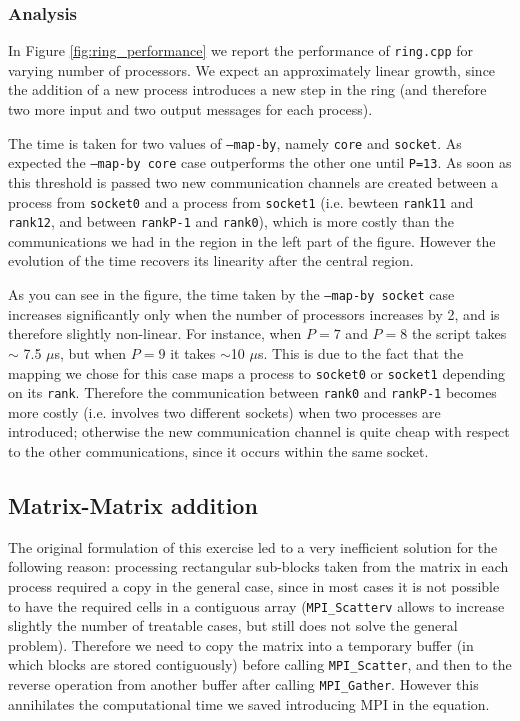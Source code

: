 \documentclass{article}
\begin{document}
\subsubsection{Analysis}
In Figure \ref{fig:ring_performance} we report the performance of \texttt{ring.cpp} for varying number of processors. We expect an approximately linear growth, since the addition of a new process introduces a new step in the ring (and therefore two more input and two output messages for each process).

The time is taken for two values of \texttt{--map-by}, namely \texttt{core} and \texttt{socket}. As expected the \texttt{--map-by core} case outperforms the other one until \texttt{P=13}. As soon as this threshold is passed two new communication channels are created between a process from \texttt{socket0} and a process from \texttt{socket1} (i.e. bewteen \texttt{rank11} and \texttt{rank12}, and between \texttt{rankP-1} and \texttt{rank0}), which is more costly than the communications we had in the region in the left part of the figure. However the evolution of the time recovers its linearity after the central region.

As you can see in the figure, the time taken by the \texttt{--map-by socket} case increases significantly only when the number of processors increases by 2, and is therefore slightly non-linear. For instance, when $P=7$ and $P=8$ the script takes $\sim$ 7.5 $\mu$s, but when $P=9$ it takes $\sim$10 $\mu$s. This is due to the fact that the mapping we chose for this case maps a process to \texttt{socket0} or \texttt{socket1} depending on its \texttt{rank}. Therefore the communication between \texttt{rank0} and \texttt{rankP-1} becomes more costly (i.e. involves two different sockets) when two processes are introduced; otherwise the new communication channel is quite cheap with respect to the other communications, since it occurs within the same socket.

\subsection{Matrix-Matrix addition}
The original formulation of this exercise led to a very inefficient solution for the following reason: processing rectangular sub-blocks taken from the matrix in each process required a copy in the general case, since in most cases it is not possible to have the required cells in a contiguous array (\texttt{MPI\_Scatterv} allows to increase slightly the number of treatable cases, but still does not solve the general problem). Therefore we need to copy the matrix into a temporary buffer (in which blocks are stored contiguously) before calling \texttt{MPI\_Scatter}, and then to the reverse operation from another buffer after calling \texttt{MPI\_Gather}. However this annihilates the computational time we saved introducing MPI in the equation.
\end{document}
